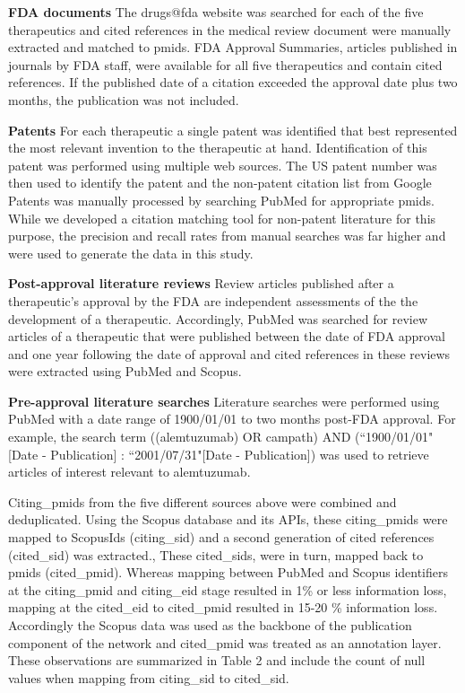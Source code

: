 \documentclass[10pt,letterpaper]{article}
\begin{document}
\textbf{FDA documents} The drugs@fda website\cite{bib6} was searched for each of the five therapeutics and cited references in the medical review document were manually extracted and matched to pmids. FDA Approval Summaries, articles published in journals by FDA staff, were available for all five therapeutics and contain cited references. If the published date of a citation exceeded the approval date plus two months, the publication was not included.

\textbf{Patents} For each therapeutic a single patent was identified that best represented the most relevant invention to the therapeutic at hand. Identification of this patent was performed using multiple web sources. The US patent number was then used to identify the patent and the non-patent citation list from Google Patents \cite{bib8} was manually processed by searching PubMed for appropriate pmids. While we developed a citation matching tool for non-patent literature for this purpose, the precision and recall rates from manual searches was far higher and were used to generate the data in this study.

\textbf{Post-approval literature reviews} Review articles published after a therapeutic's approval by the FDA are independent assessments of the the development of a therapeutic. Accordingly, PubMed was searched for review articles of a therapeutic that were published between the date of FDA approval and one year following the date of approval and cited references in these reviews were extracted using PubMed and Scopus.

\textbf{Pre-approval literature searches} Literature searches were performed using PubMed with a date range of 1900/01/01 to two months post-FDA approval. For example, the search term ((alemtuzumab) OR campath) AND (``1900/01/01"[Date - Publication] : ``2001/07/31"[Date - Publication]) was used to retrieve articles of interest relevant to alemtuzumab.

Citing\_pmids from the five different sources above  were combined and deduplicated. Using the Scopus database and its APIs, these citing\_pmids were mapped to ScopusIds (citing\_sid) and a second generation of cited references (cited\_sid) was extracted., These cited\_sids, were in turn, mapped back to pmids (cited\_pmid). Whereas mapping between PubMed and Scopus identifiers at the citing\_pmid and citing\_eid stage resulted in 1\% or less information loss, mapping at the cited\_eid to cited\_pmid resulted in 15-20 \% information loss. Accordingly the Scopus data  was used as the backbone of the publication component of the network and cited\_pmid was treated as an annotation layer.  These observations are summarized in Table 2 and include the count of null values when mapping from citing\_sid to cited\_sid.
\end{document}

